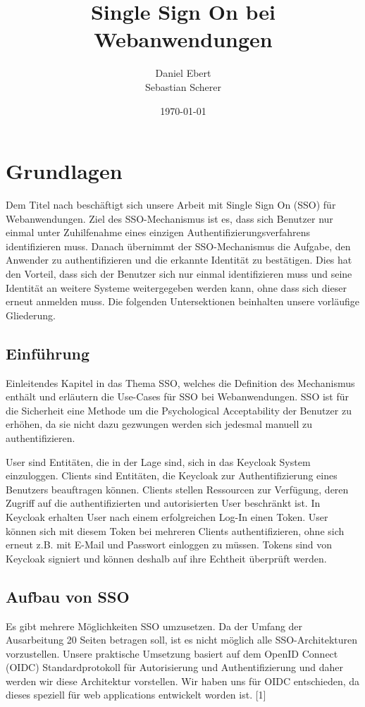 \documentclass[12pt]{article}
\title{Single Sign On bei Webanwendungen}
\author{Daniel Ebert \\
	Sebastian Scherer}
\date{\today}
\begin{document}
\maketitle
	
\section{Grundlagen}
Dem Titel nach beschäftigt sich unsere Arbeit mit Single Sign On (SSO) für Webanwendungen.
Ziel des SSO-Mechanismus ist es, dass sich Benutzer nur einmal unter Zuhilfenahme eines einzigen Authentifizierungsverfahrens identifizieren muss.
Danach übernimmt der SSO-Mechanismus die Aufgabe, den Anwender zu authentifizieren und die erkannte Identität zu bestätigen. Dies hat den Vorteil, dass sich der Benutzer sich nur einmal identifizieren muss und seine Identität an weitere Systeme weitergegeben werden kann, ohne dass sich dieser erneut anmelden muss.
Die folgenden Untersektionen beinhalten unsere vorläufige Gliederung.

\subsection{Einführung}	
Einleitendes Kapitel in das Thema SSO, welches die Definition des Mechanismus enthält und erläutern die Use-Cases für SSO bei Webanwendungen. SSO ist für die Sicherheit eine Methode um die Psychological Acceptability der Benutzer zu erhöhen, da sie nicht dazu gezwungen werden sich jedesmal manuell zu authentifizieren.

User sind Entitäten, die in der Lage sind, sich in das Keycloak System einzuloggen. Clients sind Entitäten, die Keycloak zur Authentifizierung eines Benutzers beauftragen können. Clients stellen Ressourcen zur Verfügung, deren Zugriff auf die authentifizierten und autorisierten User beschränkt ist. In Keycloak erhalten User nach einem erfolgreichen Log-In einen Token. User können sich mit diesem Token bei mehreren Clients authentifizieren, ohne sich erneut z.B. mit E-Mail und Passwort einloggen zu müssen. Tokens sind von Keycloak signiert und können deshalb auf ihre Echtheit überprüft werden.
	
\subsection{Aufbau von SSO}	
Es gibt mehrere Möglichkeiten SSO umzusetzen. Da der Umfang der Ausarbeitung 20 Seiten betragen soll, ist es nicht möglich alle SSO-Architekturen vorzustellen. Unsere praktische Umsetzung basiert auf dem OpenID Connect (OIDC) Standardprotokoll für Autorisierung und Authentifizierung und daher werden wir diese Architektur vorstellen. Wir haben uns für OIDC entschieden, da dieses speziell für web applications entwickelt worden ist. [1]
\end{document}
